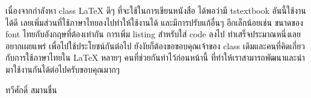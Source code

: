 \begin{summary}
 เนื่องจากกำลังหา class \LaTeX{} ดีๆ ที่จะใช้ในการเขียนหนังสือ ได้พอว่ามี tstextbook อันนี้ใช้งานได้ดี เลยเพิ่มส่วนที่ใช้ภาษาไทยลงไปทำให้ใช้งานได้ และมีการปรับแก้อื่นๆ อีกเล็กน้อยเช่น ขนาดของ font ไทยกับอังกฤษที่ต้องเท่ากัน การเพิ่ม listing สำหรับใส่ code ลงไป ทำเสร็จประมาณหนึ่งเลยอยากเผยแพร่ เพื่อไปใช้ประโยชน์กันต่อไป  ยังงัยก็ต้องขอขอบคุณเจ้าของ class เดิมและคนที่คิดเกี่ยวกับการใช้ภาษาไทยใน \LaTeX{ } หลายๆ คนที่ช่วยกันทำไว้ก่อนหน้านี้ ที่ทำให้เราสามารถพัฒนาและนำมาใช้งานกันได้ต่อไปครับขอบคุณมากๆ 
 
 ทวีศักดิ์ สมานชื่น
\end{summary}